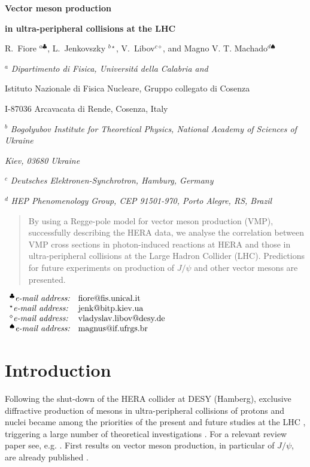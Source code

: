 \documentclass[12pt]{article}
\begin{document}
\vskip 0.5cm \centerline{\bf\Large Vector meson production}
\centerline{\bf\Large in ultra-peripheral collisions at the LHC}  \vskip 0.3cm
\centerline{R.~Fiore $^{a\clubsuit}$, L.~Jenkovszky $^{b\star}$, V.~Libov$^{c\diamond}$, and Magno V. T. Machado$^{d\spadesuit}$}

\vskip 1cm

\centerline{$^a$ \sl Dipartimento di Fisica, Universit\'a della Calabria and}
\centerline{Istituto Nazionale di Fisica Nucleare, Gruppo collegato di Cosenza}
\centerline{I-87036 Arcavacata di Rende, Cosenza, Italy}
\centerline{$^b$ \sl Bogolyubov Institute for Theoretical Physics,
National Academy of Sciences of Ukraine} \centerline{\sl Kiev,
03680 Ukraine}
\centerline{$^c$ \sl Deutsches Elektronen-Synchrotron, Hamburg, Germany}
\centerline{$^d$ \sl HEP Phenomenology Group, CEP 91501-970, Porto Alegre, RS, Brazil}
\vskip
0.1cm

\begin{abstract}\noindent
By using a Regge-pole model for vector meson production (VMP), successfully describing the HERA data, we analyse the correlation between VMP cross sections in photon-induced reactions at HERA and those in ultra-peripheral collisions at the Large Hadron Collider (LHC).
Predictions for future experiments on production of $J/\psi$ and other vector mesons are presented.
\end{abstract}

\vskip 0.1cm

$
\begin{array}{ll}
^{\clubsuit}\mbox{{\it e-mail address:}} &
\mbox{fiore@fis.unical.it}\\
^{\star}\mbox{{\it e-mail address:}} &
   \mbox{jenk@bitp.kiev.ua} \\
^{\diamond}\mbox{{\it e-mail address:}} &
   \mbox{vladyslav.libov@desy.de} \\
 ^{\spadesuit}\mbox{{\it e-mail address:}} &
\mbox{magnus@if.ufrgs.br}\\  

\end{array}
$


\section{Introduction}\label{Int}

Following the shut-down of the HERA collider at DESY (Hamberg), exclusive diffractive production of mesons in ultra-peripheral collisions of protons and nuclei became among the priorities of the present and future studies at the LHC \cite{LHCb1, LHCb2}, triggering a large number of theoretical investigations \cite{Schafer, Brazil, Ryskin, Motyka, Szczurek}.
For a relevant review paper see, e.g. \cite{Review}.
First results on vector meson production, in particular of $J/\psi$, are already published \cite{LHCb1, LHCb2}.
\end{document}
